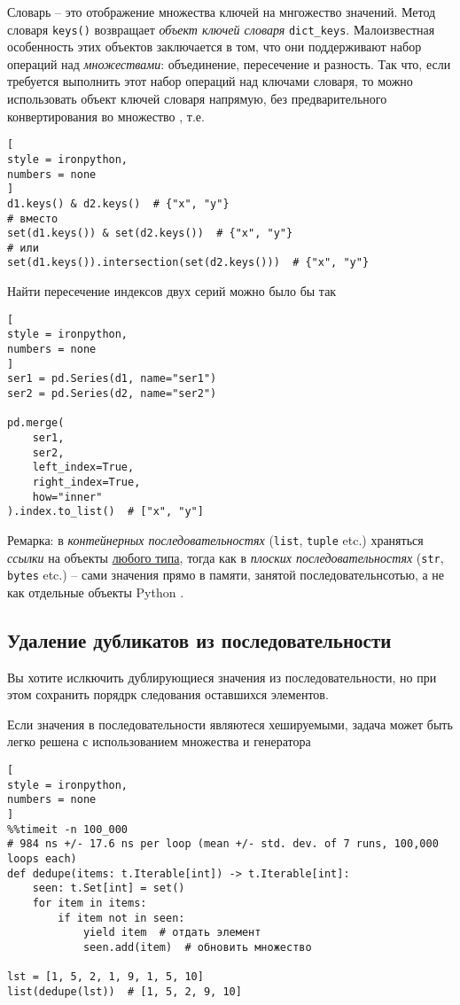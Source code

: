 \documentclass[%
	11pt,
	a4paper,
	utf8,
		]{article}
\begin{document}
Словарь -- это отображение множества ключей на мнгожество значений. Метод словаря \texttt{keys()} возвращает \emph{объект ключей словаря} \texttt{dict\_keys}. Малоизвестная особенность этих объектов заключается в том, что они поддерживают набор операций над \emph{множествами}: объединение, пересечение и разность. Так что, если требуется выполнить этот набор операций над ключами словаря, то можно использовать объект ключей словаря напрямую, без предварительного конвертирования во множество \cite[]{beazley:python_cookbook-2019}, т.е.
\begin{lstlisting}[
style = ironpython,
numbers = none
]
d1.keys() & d2.keys()  # {"x", "y"}
# вместо
set(d1.keys()) & set(d2.keys())  # {"x", "y"}
# или
set(d1.keys()).intersection(set(d2.keys()))  # {"x", "y"}
\end{lstlisting}

Найти пересечение индексов двух серий можно было бы так
\begin{lstlisting}[
style = ironpython,
numbers = none
]
ser1 = pd.Series(d1, name="ser1")
ser2 = pd.Series(d2, name="ser2")

pd.merge(
    ser1,
    ser2,
    left_index=True,
    right_index=True,
    how="inner"
).index.to_list()  # ["x", "y"]
\end{lstlisting}

Ремарка: в \emph{контейнерных последовательностях} (\verb|list|, \verb*|tuple| etc.) храняться \emph{ссылки} на объекты \underline{любого типа}, тогда как в \emph{плоских последовательностях} (\verb|str|, \verb*|bytes| etc.) -- сами значения прямо в памяти, занятой последовательнсотью, а не как отдельные объекты Python \cite[]{ramalho:python-2022}.

\subsection{Удаление дубликатов из последовательности}

Вы хотите ислкючить дублирующиеся значения из последовательности, но при этом сохранить порядрк следования оставшихся элементов.

Если значения в последовательности являютеся хешируемыми, задача может быть легко решена с использованием множества и генератора
\begin{lstlisting}[
style = ironpython,
numbers = none
]
%%timeit -n 100_000
# 984 ns +/- 17.6 ns per loop (mean +/- std. dev. of 7 runs, 100,000 loops each)
def dedupe(items: t.Iterable[int]) -> t.Iterable[int]:
    seen: t.Set[int] = set()
    for item in items:
        if item not in seen:
            yield item  # отдать элемент
            seen.add(item)  # обновить множество
            
lst = [1, 5, 2, 1, 9, 1, 5, 10]
list(dedupe(lst))  # [1, 5, 2, 9, 10]
\end{lstlisting}
\end{document}
